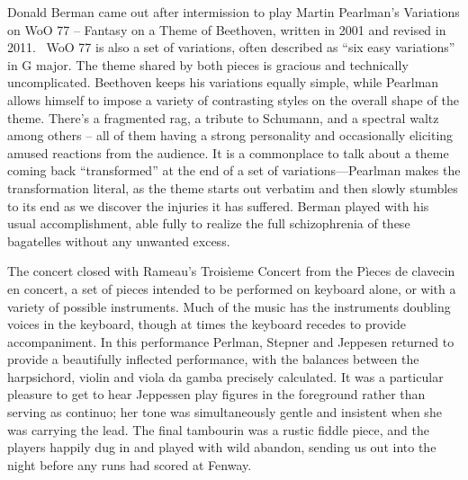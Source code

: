 Donald Berman came out after intermission to play Martin Pearlman’s Variations on WoO 77 – Fantasy on a Theme of Beethoven, written in 2001 and revised in 2011.  WoO 77 is also a set of variations, often described as “six easy variations” in G major. The theme shared by both pieces is gracious and technically uncomplicated. Beethoven keeps his variations equally simple, while Pearlman allows himself to impose a variety of contrasting styles on the overall shape of the theme. There’s a fragmented rag, a tribute to Schumann, and a spectral waltz among others – all of them having a strong personality and occasionally eliciting amused reactions from the audience. It is a commonplace to talk about a theme coming back “transformed” at the end of a set of variations—Pearlman makes the transformation literal, as the theme starts out verbatim and then slowly stumbles to its end as we discover the injuries it has suffered. Berman played with his usual accomplishment, able fully to realize the full schizophrenia of these bagatelles without any unwanted excess.

The concert closed with Rameau’s Troisìeme Concert from the Pìeces de clavecin en concert, a set of pieces intended to be performed on keyboard alone, or with a variety of possible instruments. Much of the music has the instruments doubling voices in the keyboard, though at times the keyboard recedes to provide accompaniment. In this performance Perlman, Stepner and Jeppesen returned to provide a beautifully inflected performance, with the balances between the harpsichord, violin and viola da gamba precisely calculated. It was a particular pleasure to get to hear Jeppessen play figures in the foreground rather than serving as continuo; her tone was simultaneously gentle and insistent when she was carrying the lead. The final tambourin was a rustic fiddle piece, and the players happily dug in and played with wild abandon, sending us out into the night before any runs had scored at Fenway.
